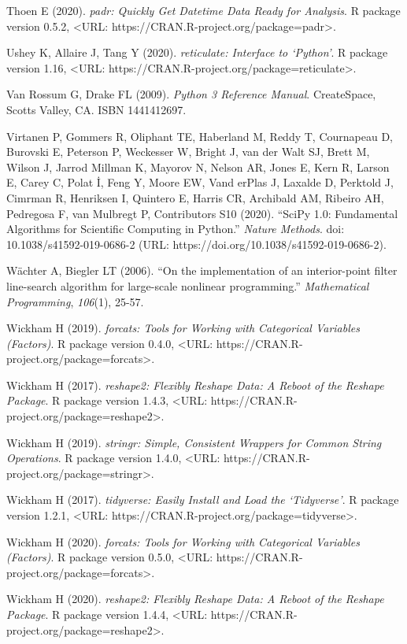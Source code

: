 \documentclass{puthesis}
\begin{document}
Thoen E (2020). \emph{padr: Quickly Get Datetime Data Ready for
Analysis}. R package version 0.5.2, \textless URL:
https://CRAN.R-project.org/package=padr\textgreater.

Ushey K, Allaire J, Tang Y (2020). \emph{reticulate: Interface to
`Python'}. R package version 1.16, \textless URL:
https://CRAN.R-project.org/package=reticulate\textgreater.

Van Rossum G, Drake FL (2009). \emph{Python 3 Reference Manual}.
CreateSpace, Scotts Valley, CA. ISBN 1441412697.

Virtanen P, Gommers R, Oliphant TE, Haberland M, Reddy T, Cournapeau D,
Burovski E, Peterson P, Weckesser W, Bright J, van der Walt SJ, Brett M,
Wilson J, Jarrod Millman K, Mayorov N, Nelson AR, Jones E, Kern R,
Larson E, Carey C, Polat İ, Feng Y, Moore EW, Vand erPlas J, Laxalde D,
Perktold J, Cimrman R, Henriksen I, Quintero E, Harris CR, Archibald AM,
Ribeiro AH, Pedregosa F, van Mulbregt P, Contributors S10 (2020).
``SciPy 1.0: Fundamental Algorithms for Scientific Computing in
Python.'' \emph{Nature Methods}. doi: 10.1038/s41592-019-0686-2 (URL:
https://doi.org/10.1038/s41592-019-0686-2).

Wächter A, Biegler LT (2006). ``On the implementation of an
interior-point filter line-search algorithm for large-scale nonlinear
programming.'' \emph{Mathematical Programming}, \emph{106}(1), 25-57.

Wickham H (2019). \emph{forcats: Tools for Working with Categorical
Variables (Factors)}. R package version 0.4.0, \textless URL:
https://CRAN.R-project.org/package=forcats\textgreater.

Wickham H (2017). \emph{reshape2: Flexibly Reshape Data: A Reboot of the
Reshape Package}. R package version 1.4.3, \textless URL:
https://CRAN.R-project.org/package=reshape2\textgreater.

Wickham H (2019). \emph{stringr: Simple, Consistent Wrappers for Common
String Operations}. R package version 1.4.0, \textless URL:
https://CRAN.R-project.org/package=stringr\textgreater.

Wickham H (2017). \emph{tidyverse: Easily Install and Load the
`Tidyverse'}. R package version 1.2.1, \textless URL:
https://CRAN.R-project.org/package=tidyverse\textgreater.

Wickham H (2020). \emph{forcats: Tools for Working with Categorical
Variables (Factors)}. R package version 0.5.0, \textless URL:
https://CRAN.R-project.org/package=forcats\textgreater.

Wickham H (2020). \emph{reshape2: Flexibly Reshape Data: A Reboot of the
Reshape Package}. R package version 1.4.4, \textless URL:
https://CRAN.R-project.org/package=reshape2\textgreater.
\end{document}
